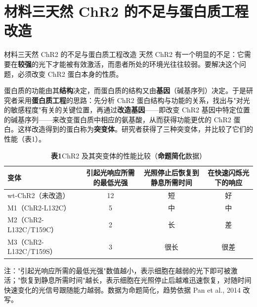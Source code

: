 \documentclass[UTF8,a4paper,11pt]{ctexart}
\newcommand{\key}[1]{\textbf{\color{deepred}#1}}
\begin{document}
\section{材料三\quad 天然 ChR2 的不足与蛋白质工程改造}

\begin{matbox}{材料三\quad 天然 ChR2 的不足与蛋白质工程改造}
天然 ChR2 有一个明显的不足：它需要在\textbf{较强}的光下才能被有效激活，而患者所处的环境光往往较弱。要解决这个问题，必须改变 ChR2 蛋白本身的性质。

蛋白质的功能由其\textbf{结构}决定，而蛋白质的结构又由\textbf{基因}（碱基序列）决定。于是研究者采用\textbf{蛋白质工程}的思路：先分析 ChR2 蛋白结构与功能的关系，找出与"对光的敏感程度"有关的关键位置，再通过\textbf{改造基因}——即改变 ChR2 基因中特定位置的碱基序列——来改变蛋白质中相应的氨基酸，从而获得功能更优的 ChR2 蛋白。这样改造得到的蛋白称为\textbf{突变体}。研究者获得了三种突变体，并比较了它们的性能（表1）。
\end{matbox}

\begin{table}[H]
\centering\small
\caption*{\textbf{表1}\quad ChR2 及其突变体的性能比较（\key{命题简化}数据）}
\begin{tabular}{@{}lccc@{}}
\toprule
\textbf{变体} & \textbf{引起光响应所需的最低光强} & \textbf{光照停止后恢复到静息所需时间} & \textbf{在快速闪烁光下的响应} \\
\midrule
wt-ChR2（未改造） & 12 & 短 & 好 \\
M1（ChR2-L132C） & 5 & 中 & 中 \\
M2（ChR2-L132C/T159C） & 2 & 长 & 差 \\
M3（ChR2-L132C/T159S） & 3 & 很长 & 很差 \\
\bottomrule
\end{tabular}

\smallskip
\parbox{0.94\textwidth}{\footnotesize 注："引起光响应所需的最低光强"数值越小，表示细胞在越弱的光下即可被激活；"恢复到静息所需时间"越长，表示细胞在光照停止后越难迅速恢复，对随时间快速变化的光信号跟随能力越弱。数据为命题简化，趋势依据 Pan et al., 2014 改写。}
\end{table}
\end{document}
